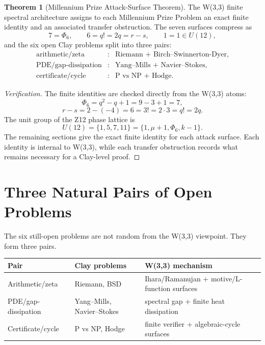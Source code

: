 \documentclass[11pt]{article}
\theoremstyle{definition}
\newtheorem{theorem}{Theorem}
\newcommand{\PhiSix}{\Phi_6}
\begin{document}
\begin{theorem}[Millennium Prize Attack-Surface Theorem]
The W(3,3) finite spectral architecture assigns to each Millennium Prize Problem an exact finite identity and an associated transfer obstruction.  The seven surfaces compress as
\[
  7=\PhiSix,
  \qquad 6=q!=2q=r-s,
  \qquad 1=1\in U(12),
\]
and the six open Clay problems split into three pairs:
\[
\begin{array}{lll}
\text{arithmetic/zeta} &:& \text{Riemann + Birch--Swinnerton-Dyer},\\
\text{PDE/gap-dissipation} &:& \text{Yang--Mills + Navier--Stokes},\\
\text{certificate/cycle} &:& \text{P vs NP + Hodge}.
\end{array}
\]
\end{theorem}

\begin{proof}[Verification]
The finite identities are checked directly from the W(3,3) atoms:
\[
  \PhiSix=q^2-q+1=9-3+1=7,
\]
\[
  r-s=2-(-4)=6=3!=2\cdot3=q!=2q.
\]
The unit group of the Z12 phase lattice is
\[
  U(12)=\{1,5,7,11\}=\{1,\mu+1,\PhiSix,k-1\}.
\]
The remaining sections give the exact finite identity for each attack surface.  Each identity is internal to W(3,3), while each transfer obstruction records what remains necessary for a Clay-level proof.
\end{proof}

\section{Three Natural Pairs of Open Problems}

The six still-open problems are not random from the W(3,3) viewpoint.  They form three pairs.

\begin{center}
\begin{tabular}{lll}
\toprule
Pair & Clay problems & W(3,3) mechanism \\
\midrule
Arithmetic/zeta & Riemann, BSD & Ihara/Ramanujan + motive/L-function surfaces \\
PDE/gap-dissipation & Yang--Mills, Navier--Stokes & spectral gap + finite heat dissipation \\
Certificate/cycle & P vs NP, Hodge & finite verifier + algebraic-cycle surfaces \\
\bottomrule
\end{tabular}
\end{center}
\end{document}
